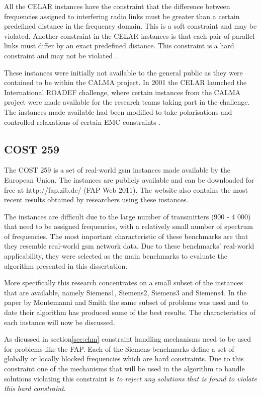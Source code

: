 All the CELAR instances have the constraint that the difference between frequencies assigned to interfering radio links must be greater than a certain predefined distance in the frequency domain\cite{Karen2004}. This is a soft constraint and may be violated. Another constraint in the CELAR instances is that each pair of parallel links must differ by an exact predefined distance\cite{Karen2004}. This constraint is a hard constraint and may not be violated \cite{DynamicFAP}.

These instances were initially not available to the general public as they were contained to be within the CALMA project\cite{CALMA}. In 2001 the CELAR launched the International ROADEF challenge, where certain instances from the CALMA project were made available for the research teams taking part in the challenge\cite{CALMA}. The instances made available had been modified to take polarisations and controlled relaxations of certain EMC constraints \cite{LowerPolarFAP}.
\subsection{COST 259}
\label{sec:COST259}
The \gls{COST} 259 is a set of real-world \gls{gsm} instances made available by the European Union. The instances are publicly available and can  be downloaded for free at http://fap.zib.de/ (FAP Web 2011). The website also contains the most recent results obtained by researchers using these instances\cite{Karen2004,Eisenblatter}.

The instances are difficult due to the large number of transmitters (900 - 4 000) that need to be assigned frequencies, with a relatively small number of spectrum of frequencies. The most important characteristic of these benchmarks are that they resemble real-world \gls{gsm} network data. Due to these benchmarks' real-world applicability, they were selected as the main benchmarks to evaluate the algorithm presented in this dissertation.

More specifically this research concentrates on a small subset of the instances that are available, namely Siemens1, Siemens2, Siemens3 and Siemens4. In the paper by Montemanni and Smith \cite{TabuMontemanniSmith} the same subset of problems was used and to date their algorithm has produced some of the best results. The characteristics of each instance will now be discussed.

As dicussed in section\ref{sec:chm} constraint handling mechanisms need to be used for problems like the \gls{FAP}. Each of the Siemens benchmarks define a set of globally or locally blocked frequencies which are hard constraints. Due to this constraint one of the mechanisms that will be used in the algorithm to handle solutions violating this constraint is \emph{to reject any solutions that is found to violate this hard constraint}.
